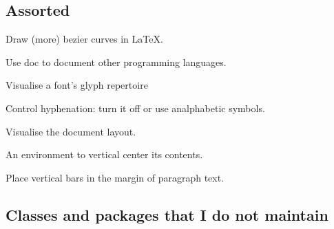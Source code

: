 \documentclass{ltugboat}
\begin{document}
\subsection{Assorted}

\begin{description}[font=\normalfont\sffamily]
\item [bez123 \& multiply] Draw (more) bezier curves in \LaTeX.
\item [docmfp] Use \textsf{doc} to document other programming languages.
\item [fonttable] Visualise a font's glyph repertoire
\item [hyphenat] Control hyphenation: turn it off or use analphabetic symbols.
\item [layouts] Visualise the document layout.
\item [midpage] An environment to vertical center its contents.
\item [vertbars] Place vertical bars in the margin of paragraph text.
\end{description}


\subsection{Classes and packages that I do not maintain}
\end{document}
